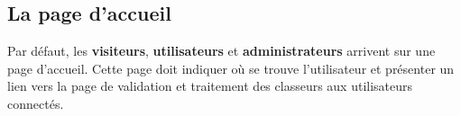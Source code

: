 \subsection{La page d'accueil}
\label{subsec:home-page}

Par défaut, les \textbf{visiteurs}, \textbf{utilisateurs} et \textbf{administrateurs} arrivent sur une page d'accueil.
Cette page doit indiquer où se trouve l'utilisateur et présenter un lien vers la page de validation et traitement des classeurs aux utilisateurs connectés.
